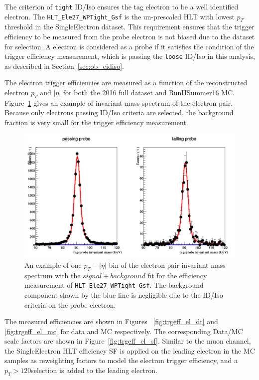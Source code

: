 The criterion of \texttt{tight} ID/Iso ensures the tag electron to be a well identified electron. The \texttt{HLT\_Ele27\_WPTight\_Gsf} is the un-prescaled HLT with lowest $p_T$ threshold in the SingleElectron dataset. This requirement ensures that the trigger efficiency to be measured from the probe electron is not biased due to the dataset for selection. A electron is considered as a probe if it satisfies the condition of the trigger efficiency measurement, which is passing the \texttt{loose} ID/Iso in this analysis, as described in Section~\ref{sec:ob_eidiso}.

\vspace{0.3cm}
The electron trigger efficiencies are measured as a function of the reconstructed electron $p_T$ and $|\eta|$ for both the 2016 full dataset and RunIISummer16 MC. Figure~\ref{fig:bg_etrgtnp} gives an example of invariant mass spectrum of the electron pair. Because only electrons passing ID/Iso criteria are selected, the background fraction is very small for the trigger efficiency measurement.

\begin{figure}[htpb]
\begin{center}
\includegraphics[width=0.95\linewidth, page=1]{figures/bg_etrgtnp.png}
\caption{An example of one  $p_T - |\eta|$ bin of the electron pair invariant mass spectrum with the $signal+background$ fit for the efficiency measurement of \texttt{HLT\_Ele27\_WPTight\_Gsf}. The background component shown by the blue line is negligible due to the ID/Iso criteria on the probe electron.}
\label{fig:bg_etrgtnp}
\end{center}
\end{figure}

\vspace{0.3cm}
The measured efficiencies are shown in Figures ~\ref{fig:trgeff_el_dt} and \ref{fig:trgeff_el_mc} for data and MC respectively. The corresponding Data/MC scale factors are shown in Figure~\ref{fig:trgeff_el_sf}. Similar to the muon channel, the SingleElectron HLT efficiency SF is applied on the leading electron in the MC samples as reweighting factors to model the electron trigger efficiency, and a $p_T > 120$\GeV selection is added to the leading electron.

